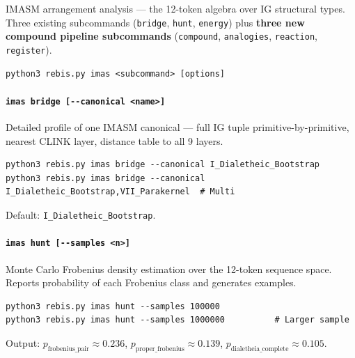 \documentclass[12pt,a4paper]{article}
\begin{document}
IMASM arrangement analysis --- the 12-token algebra over IG structural
types. Three existing subcommands (\texttt{bridge}, \texttt{hunt},
\texttt{energy}) plus \textbf{three new compound pipeline subcommands}
(\texttt{compound}, \texttt{analogies}, \texttt{reaction},
\texttt{register}).

\begin{verbatim}
python3 rebis.py imas <subcommand> [options]
\end{verbatim}

\hypertarget{imas-bridge---canonical-name}{%
\paragraph{\texorpdfstring{\texttt{imas\ bridge\ {[}-\/-canonical\ \textless{}name\textgreater{}{]}}}{imas bridge {[}-\/-canonical \textless name\textgreater{]}}}\label{imas-bridge---canonical-name}}

Detailed profile of one IMASM canonical --- full IG tuple
primitive-by-primitive, nearest CLINK layer, distance table to all 9
layers.

\begin{verbatim}
python3 rebis.py imas bridge --canonical I_Dialetheic_Bootstrap
python3 rebis.py imas bridge --canonical I_Dialetheic_Bootstrap,VII_Parakernel  # Multi
\end{verbatim}

Default: \texttt{I\_Dialetheic\_Bootstrap}.

\hypertarget{imas-hunt---samples-n}{%
\paragraph{\texorpdfstring{\texttt{imas\ hunt\ {[}-\/-samples\ \textless{}n\textgreater{}{]}}}{imas hunt {[}-\/-samples \textless n\textgreater{]}}}\label{imas-hunt---samples-n}}

Monte Carlo Frobenius density estimation over the 12-token sequence
space. Reports probability of each Frobenius class and generates
examples.

\begin{verbatim}
python3 rebis.py imas hunt --samples 100000
python3 rebis.py imas hunt --samples 1000000          # Larger sample
\end{verbatim}

Output: \(p_{\text{frobenius\_pair}} \approx 0.236\),
\(p_{\text{proper\_frobenius}} \approx 0.139\),
\(p_{\text{dialetheia\_complete}} \approx 0.105\).
\end{document}
